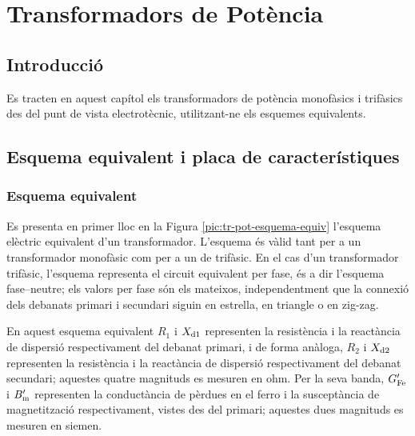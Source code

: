 \chapter{Transformadors de Potència}

\section{Introducció}
Es tracten en aquest capítol els transformadors de potència
monofàsics i trifàsics des del punt de vista electrotècnic, utilitzant-ne els esquemes equivalents.

\section{Esquema equivalent i placa de característiques}

\subsection{Esquema equivalent}

Es presenta en primer lloc en la Figura \vref{pic:tr-pot-esquema-equiv} l'esquema elèctric equivalent d'un transformador.
L'esquema és vàlid tant per a un transformador monofàsic com per a un de trifàsic. En el cas d'un transformador trifàsic, l'esquema representa el circuit equivalent per fase, és a dir l'esquema fase--neutre; els valors per fase són els mateixos, independentment que la connexió dels debanats primari i secundari siguin en estrella, en triangle o en zig-zag.

\begin{center}
    
    \label{pic:tr-pot-esquema-equiv}
\end{center}

En aquest esquema equivalent $R_1$ i $X_\mathrm{d1}$ representen la resistència i la reactància de dispersió respectivament del debanat primari, i de forma anàloga, $R_2$ i $X_\mathrm{d2}$ representen la resistència i la reactància de dispersió respectivament del debanat secundari; aquestes quatre magnituds es mesuren en ohm. Per la seva banda, $G_\mathrm{Fe}'$ i $B_\mathrm{m}'$ representen la conductància de pèrdues en el ferro i la susceptància de magnetització respectivament, vistes des del primari; aquestes dues magnituds es mesuren en siemen.

